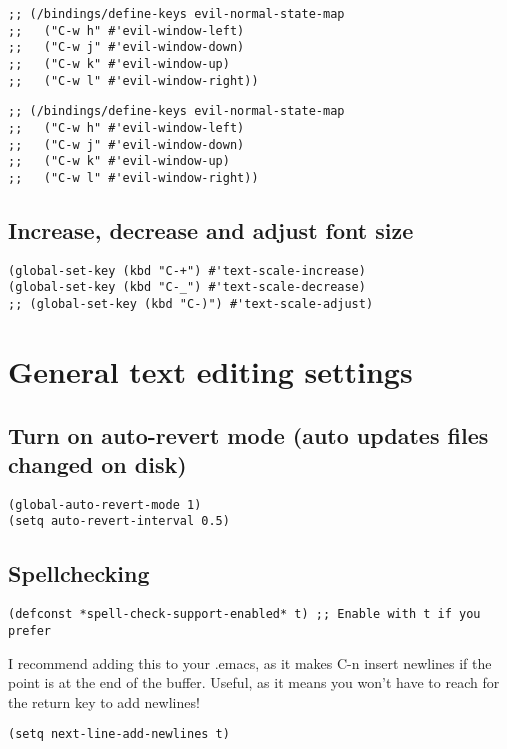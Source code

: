 \documentclass[11pt]{article}
\begin{document}
\begin{verbatim}
;; (/bindings/define-keys evil-normal-state-map
;;   ("C-w h" #'evil-window-left)
;;   ("C-w j" #'evil-window-down)
;;   ("C-w k" #'evil-window-up)
;;   ("C-w l" #'evil-window-right))
\end{verbatim}


\begin{verbatim}
;; (/bindings/define-keys evil-normal-state-map
;;   ("C-w h" #'evil-window-left)
;;   ("C-w j" #'evil-window-down)
;;   ("C-w k" #'evil-window-up)
;;   ("C-w l" #'evil-window-right))
\end{verbatim}


\subsection*{Increase, decrease and adjust font size}
\label{sec:org9d14cae}

\begin{verbatim}
(global-set-key (kbd "C-+") #'text-scale-increase)
(global-set-key (kbd "C-_") #'text-scale-decrease)
;; (global-set-key (kbd "C-)") #'text-scale-adjust)
\end{verbatim}


\section*{General text editing settings}
\label{sec:org8bb745d}

\subsection*{Turn on auto-revert mode (auto updates files changed on disk)}
\label{sec:org797c0e9}
\begin{verbatim}
(global-auto-revert-mode 1)
(setq auto-revert-interval 0.5)
\end{verbatim}


\subsection*{Spellchecking}
\label{sec:org439356f}
\begin{verbatim}
(defconst *spell-check-support-enabled* t) ;; Enable with t if you prefer
\end{verbatim}

I recommend adding this to your .emacs, as it makes C-n insert newlines if the point is at the end of the buffer. Useful, as it means you won’t have to reach for the return key to add newlines!
\begin{verbatim}
(setq next-line-add-newlines t)
\end{verbatim}
\end{document}
